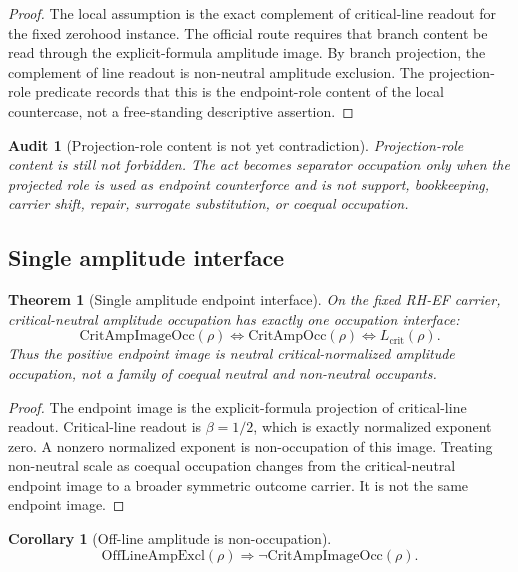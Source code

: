 \documentclass[11pt]{article}
\newtheorem{theorem}{Theorem}[section]
\newtheorem{corollary}{Corollary}[section]
\newtheorem{audit}{Audit}[section]
\newcommand{\Lcrit}{L_{\mathrm{crit}}}
\newcommand{\CritAmpOcc}{\mathrm{CritAmpOcc}}
\newcommand{\CritAmpImageOcc}{\mathrm{CritAmpImageOcc}}
\newcommand{\OffAmpExcl}{\mathrm{OffLineAmpExcl}}
\begin{document}
\begin{proof}
The local assumption is the exact complement of critical-line readout for the fixed zerohood instance.  The official route requires that branch content be read through the explicit-formula amplitude image.  By branch projection, the complement of line readout is non-neutral amplitude exclusion.  The projection-role predicate records that this is the endpoint-role content of the local countercase, not a free-standing descriptive assertion.
\end{proof}

\begin{audit}[Projection-role content is not yet contradiction]
Projection-role content is still not forbidden.  The act becomes separator occupation only when the projected role is used as endpoint counterforce and is not support, bookkeeping, carrier shift, repair, surrogate substitution, or coequal occupation.
\end{audit}

\subsection{Single amplitude interface}

\begin{theorem}[Single amplitude endpoint interface]
On the fixed RH-EF carrier, critical-neutral amplitude occupation has exactly one occupation interface:
\[
\CritAmpImageOcc(\rho)\Longleftrightarrow \CritAmpOcc(\rho)\Longleftrightarrow \Lcrit(\rho).
\]
Thus the positive endpoint image is neutral critical-normalized amplitude occupation, not a family of coequal neutral and non-neutral occupants.
\end{theorem}

\begin{proof}
The endpoint image is the explicit-formula projection of critical-line readout.  Critical-line readout is \(\beta=1/2\), which is exactly normalized exponent zero.  A nonzero normalized exponent is non-occupation of this image.  Treating non-neutral scale as coequal occupation changes from the critical-neutral endpoint image to a broader symmetric outcome carrier.  It is not the same endpoint image.
\end{proof}

\begin{corollary}[Off-line amplitude is non-occupation]
\[
\OffAmpExcl(\rho)\Rightarrow \neg \CritAmpImageOcc(\rho).
\]
\end{corollary}
\end{document}
